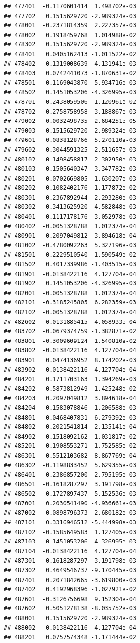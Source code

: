 \begin{frame}[fragile]
\begin{verbatim}
## 477401  -0.1170601414  1.498702e-03
## 477702   0.1515629720 -2.989324e-03
## 478001  -0.2371814359  2.227357e-03
## 478002   0.1918459768  1.014988e-02
## 478302   0.1515629720 -2.989324e-03
## 478401   0.0405162413 -1.011522e-02
## 478402   0.1319008639 -4.131941e-03
## 478403   0.0742441073 -1.870631e-02
## 478501  -0.1169043870 -5.934716e-03
## 478502   0.1451053206 -4.326995e-03
## 478701   0.2438059506  1.120961e-02
## 478702   0.2758758958 -3.188867e-03
## 479002   0.0032498735 -2.684251e-05
## 479003   0.1515629720 -2.989324e-03
## 479601   0.0838128766  5.270110e-03
## 479602   0.3044591325 -2.511657e-03
## 480102   0.1498458817  2.302950e-03
## 480103   0.1505640347  3.347782e-03
## 480201  -0.0702669805 -1.630207e-03
## 480202   0.1082402176  1.177872e-02
## 480301   0.2367892944  2.293280e-03
## 480302   0.3413625920 -4.582848e-03
## 480401   0.1117178176 -3.052978e-03
## 480402  -0.0051328788  1.012374e-04
## 480901   0.2097049812  3.894618e-04
## 481002  -0.4780092263  5.327196e-03
## 481501  -0.2229510540  1.590549e-02
## 481502   0.4017339986 -1.403515e-03
## 481901  -0.0138422116  4.127704e-04
## 481902   0.1451053206 -4.326995e-03
## 482001  -0.0051328788  1.012374e-04
## 482101  -0.3185245805  6.282359e-03
## 482102  -0.0051328788  1.012374e-04
## 482602  -0.0131885415  4.058933e-04
## 483702  -0.0679374759 -1.382871e-02
## 483801  -0.3009609124  1.540810e-02
## 483802  -0.0138422116  4.127704e-04
## 483901   0.0474136952  8.174202e-03
## 483902  -0.0138422116  4.127704e-04
## 484201   0.1711703163  1.394269e-03
## 484202   0.5873812949 -1.425248e-02
## 484203   0.2097049812  3.894618e-04
## 484204   0.1583078846  1.206588e-03
## 484801   0.0468407831 -6.279392e-03
## 484802  -0.2021541814 -2.135141e-04
## 484902   0.1518092162 -1.031817e-02
## 485201  -0.1908553271 -1.752585e-02
## 486301   0.5512103682 -8.867769e-04
## 486302  -0.1198833452  5.629355e-03
## 486401   0.2386857200 -2.795195e-03
## 486501  -0.1618287297  3.191798e-03
## 486502  -0.1727897437  5.152536e-03
## 487001   0.2030541490 -4.936661e-03
## 487002   0.0898796373 -2.680182e-03
## 487101   0.3316946512 -5.444998e-03
## 487102  -0.1585649583  1.127405e-03
## 487103   0.1451053206 -4.326995e-03
## 487104  -0.0138422116  4.127704e-04
## 487301  -0.1618287297  3.191798e-03
## 487302   0.4649546737 -9.170445e-03
## 487401   0.2071842665 -3.619800e-03
## 487402   0.4192968396 -1.027921e-02
## 487601  -0.3126756698  9.152304e-04
## 487602   0.5051278138 -8.035752e-03
## 488001   0.1515629720 -2.989324e-03
## 488002  -0.0138422116  4.127704e-04
## 488201   0.0757574348 -1.171444e-02

\end{verbatim}
\end{frame}
